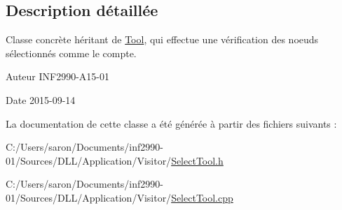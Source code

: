 \subsection{Description détaillée}
Classe concrète héritant de \hyperlink{class_tool}{Tool}, qui effectue une vérification des noeuds sélectionnés comme le compte. 

\begin{DoxyAuthor}{Auteur}
I\-N\-F2990-\/\-A15-\/01 
\end{DoxyAuthor}
\begin{DoxyDate}{Date}
2015-\/09-\/14 
\end{DoxyDate}


La documentation de cette classe a été générée à partir des fichiers suivants \-:\begin{DoxyCompactItemize}
\item 
C\-:/\-Users/saron/\-Documents/inf2990-\/01/\-Sources/\-D\-L\-L/\-Application/\-Visitor/\hyperlink{_select_tool_8h}{Select\-Tool.\-h}\item 
C\-:/\-Users/saron/\-Documents/inf2990-\/01/\-Sources/\-D\-L\-L/\-Application/\-Visitor/\hyperlink{_select_tool_8cpp}{Select\-Tool.\-cpp}\end{DoxyCompactItemize}
